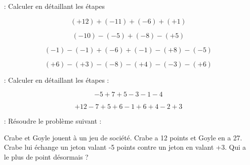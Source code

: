  : Calculer en détaillant les étapes

\begin{multicols}{2}
    $$(+12)+(-11)+(-6)+(+1)$$
    \vspace*{16em}

    $$(-10)-(-5)+(-8)-(+5)$$
    \vspace*{16em}\columnbreak

    $$(-1)-(-1)+(-6)+(-1)-(+8)-(-5)$$
    \vspace*{16em}

    $$(+6)-(+3)-(-8)-(+4)-(-3)-(+6)$$
    \vspace*{16em}
\end{multicols}

\newpage



 : Calculer en détaillant les étapes :

\begin{multicols}{2}
    $$-5+7+5-3-1-4$$
    \vspace*{16em}\columnbreak

    $$+12-7+5+6-1+6+4-2+3$$
    \vspace*{16em}

\end{multicols}

 : Résoudre le problème suivant :

Crabe et Goyle jouent à un jeu de société. Crabe a 12 points et Goyle en a 27.
Crabe lui échange un jeton valant -5 points contre un jeton en valant +3. 
Qui a le plus de point désormais ?

